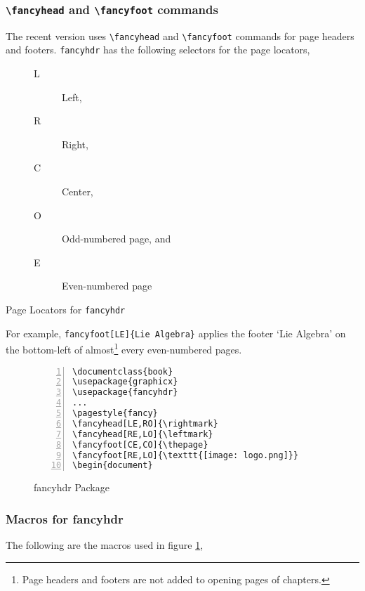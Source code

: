 \documentclass{article}
\begin{document}
\subsubsection{\texttt{\textbackslash fancyhead} and \texttt{\textbackslash fancyfoot} commands}
	The recent version uses \texttt{\textbackslash fancyhead} and \texttt{\textbackslash fancyfoot} commands for page headers and footers. \texttt{fancyhdr} has the following selectors for the page locators,
\begin{table}[h]
\centering
\begin{subfigure}{0.45\textwidth}
\begin{description} 
	\item[L] Left,
	\item[R] Right,
	\item[C] Center,
\end{description}
\end{subfigure}
\begin{subfigure}{0.45\textwidth}
\begin{description} 
	\item[O] Odd-numbered page, and
	\item[E] Even-numbered page
\end{description}
\end{subfigure}
\caption{Page Locators for \texttt{fancyhdr}}
\end{table}

	For example, \texttt{fancyfoot[LE]\{Lie Algebra\}} applies the footer `Lie Algebra' on the bottom-left of almost\footnote{Page headers and footers are not added to opening pages of chapters.} every even-numbered pages.

\begin{figure}[h]
\centering
\begin{Verbatim}[numbers = left]
\documentclass{book}
\usepackage{graphicx}
\usepackage{fancyhdr}
...
\pagestyle{fancy}
\fancyhead[LE,RO]{\rightmark}
\fancyhead[RE,LO]{\leftmark}
\fancyfoot[CE,CO]{\thepage}
\fancyfoot[RE,LO]{\texttt{[image: logo.png]}}
\begin{document}
\end{Verbatim}
\caption{fancyhdr Package}
\label{fig:fancyhdr}
\end{figure}

\subsubsection{Macros for fancyhdr}
The following are the macros used in figure \ref{fig:fancyhdr},
\end{document}
